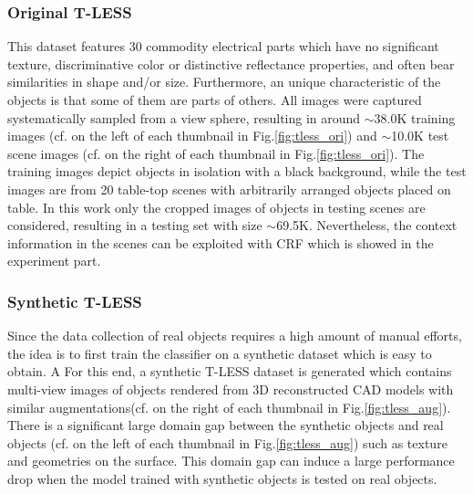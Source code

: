 

\subsubsection{Original T-LESS\cite{hodan2017tless}} \label{tless}
This dataset features 30 commodity electrical parts which have no significant texture, discriminative color or distinctive reflectance properties, and often bear similarities in shape and/or size.
Furthermore, an unique characteristic of the objects is that some of them are parts of others.
All images were captured systematically sampled from a view sphere, resulting in around $\sim$38.0K training images (cf. on the left of each thumbnail in Fig.\ref{fig:tless_ori}) and $\sim$10.0K test scene images (cf. on the right of each thumbnail in Fig.\ref{fig:tless_ori}).
The training images depict objects in isolation with a black background, while the test images are from 20 table-top scenes with arbitrarily arranged objects placed on table.
In this work only the cropped images of objects in testing scenes are considered, resulting in a testing set with size $\sim$69.5K.
Nevertheless, the context information in the scenes can be exploited with CRF  which is showed in the experiment part.

\subsubsection{Synthetic T-LESS}
Since the data collection of real objects requires a high amount of manual efforts, the idea is to first train the classifier on a synthetic dataset which is easy to obtain.
A%
For this end, a synthetic T-LESS dataset is generated which contains multi-view images of objects rendered from 3D reconstructed CAD models with similar augmentations(cf. on the right of each thumbnail in Fig.\ref{fig:tless_aug}).
There is a significant large domain gap between the synthetic objects and real objects (cf. on the left of each thumbnail in Fig.\ref{fig:tless_aug}) such as texture and geometries on the surface.
This domain gap can induce a large performance drop when the model trained with synthetic objects is tested on real objects.

